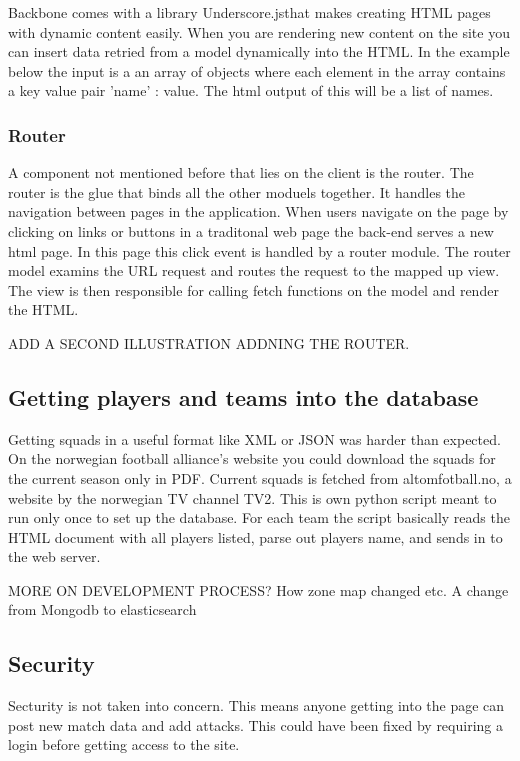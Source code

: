 Backbone comes with a library Underscore.js\footnotemark that makes creating HTML pages with dynamic content easily. When you are rendering new content on the site you can insert data retried from a model dynamically into the HTML. In the example below the input is a an array of objects where each element in the array contains a key value pair 'name' : value. The html output of this will be a list of names.




\subsubsection{Router}

A component not mentioned before that lies on the client is the router. The router is the glue that binds all the other moduels together. It handles the navigation between pages in the application. When users navigate on the page by clicking on links or buttons in a traditonal web page the back-end serves a new html page. In this page this click event is handled by a router module. The router model examins the URL request and routes the request to the mapped up view. The view is then responsible for calling fetch functions on the model and render the HTML.

ADD A SECOND ILLUSTRATION ADDNING THE ROUTER.

\subsection{Getting players and teams into the database}

Getting squads in a useful format like XML or JSON was harder than expected. On the norwegian football alliance's website you could download the squads for the current season only in PDF. Current squads is fetched from altomfotball.no, a website by the norwegian TV channel TV2. This is own python script meant to run only once to set up the database. For each team the script basically reads the HTML document with all players listed, parse out players name, and sends in to the web server.

MORE ON DEVELOPMENT PROCESS? How zone map changed etc. A change from Mongodb to elasticsearch


\subsection{Security}
Secturity is not taken into concern. This means anyone getting into the page can post new match data and add attacks. This could have been fixed by requiring a login before getting access to the site. 

